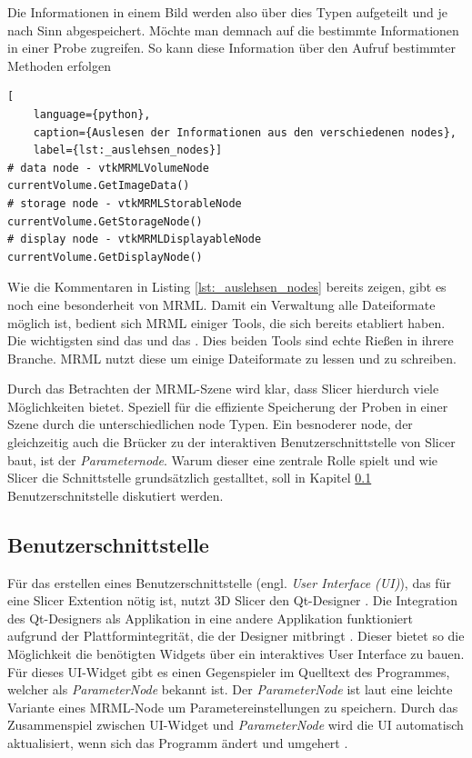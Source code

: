 Die Informationen in einem Bild werden also über dies Typen aufgeteilt und je nach
Sinn abgespeichert. Möchte man demnach auf die bestimmte Informationen in einer
Probe zugreifen. So kann diese Information über den Aufruf bestimmter Methoden erfolgen

\begin{lstlisting}[
	language={python},
	caption={Auslesen der Informationen aus den verschiedenen nodes},
	label={lst:_auslehsen_nodes}]
# data node - vtkMRMLVolumeNode
currentVolume.GetImageData()
# storage node - vtkMRMLStorableNode
currentVolume.GetStorageNode()
# display node - vtkMRMLDisplayableNode
currentVolume.GetDisplayNode()
\end{lstlisting}

Wie die Kommentaren in Listing \ref{lst:_auslehsen_nodes} bereits zeigen, gibt
es noch eine besonderheit von MRML. Damit ein Verwaltung alle Dateiformate möglich
ist, bedient sich MRML einiger Tools, die sich bereits etabliert haben. Die
wichtigsten sind das \citet{vtk2024} und das \citet{itk2024}. Dies beiden Tools sind
echte Rießen in ihrere Branche. MRML nutzt diese um einige Dateiformate zu
lessen und zu schreiben.

Durch das Betrachten der MRML-Szene wird klar, dass Slicer hierdurch viele Möglichkeiten
bietet. Speziell für die effiziente Speicherung der Proben in einer Szene durch
die unterschiedlichen node Typen. Ein besnoderer node, der gleichzeitig auch die
Brücker zu der interaktiven Benutzerschnittstelle von Slicer baut, ist der \textit{Parameternode}.
Warum dieser eine zentrale Rolle spielt und wie Slicer die Schnittstelle grundsätzlich
gestalltet, soll in Kapitel \ref{subsec:benutzerschnitstelle}
Benutzerschnitstelle diskutiert werden.

\subsection{Benutzerschnittstelle}
\label{subsec:benutzerschnitstelle} Für das erstellen eines
Benutzerschnittstelle (engl. \textit{User Interface (UI)}), das für eine Slicer Extention
nötig ist, nutzt 3D Slicer den Qt-Designer \citep[vgl.][]{qt2024}. Die
Integration des Qt-Designers als Applikation in eine andere Applikation
funktioniert aufgrund der Plattformintegrität, die der Designer mitbringt \citep[vgl.][]{qt2024}.
Dieser bietet so die Möglichkeit die benötigten Widgets über ein interaktives User
Interface zu bauen. Für dieses UI-Widget gibt es einen Gegenspieler im Quelltext
des Programmes, welcher als \textit{ParameterNode} bekannt ist. Der \textit{ParameterNode}
ist laut \citet{slicer2024} eine leichte Variante eines MRML-Node um Parametereinstellungen
zu speichern. Durch das Zusammenspiel zwischen UI-Widget und \textit{ParameterNode}
wird die UI automatisch aktualisiert, wenn sich das Programm ändert und umgehert
\citet{slicer2024}.

